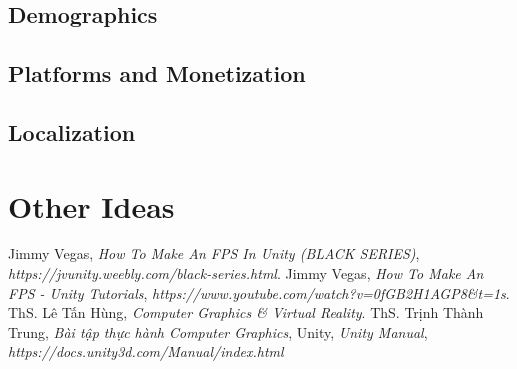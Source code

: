 \documentclass[14pt,a4paper]{extreport}
\begin{document}
\section{Demographics}
\section{Platforms and Monetization}
\section{Localization}

\chapter{Other Ideas}

\begin{thebibliography}{widestlabel}
	 Jimmy Vegas, \textit{How To Make An FPS In Unity
	(BLACK SERIES)}, \textit{https://jvunity.weebly.com/black-series.html}.
	 Jimmy Vegas, \textit{How To Make An FPS - Unity Tutorials}, \textit{https://www.youtube.com/watch?v=0fGB2H1AGP8\&t=1s}.
	 ThS. Lê Tấn Hùng, \textit{Computer Graphics \& Virtual Reality}.
	 ThS. Trịnh Thành Trung, \textit{Bài tập thực hành Computer Graphics}, 
	 Unity, \textit{Unity Manual}, \textit{https://docs.unity3d.com/Manual/index.html}
\end{thebibliography}
\end{document}
